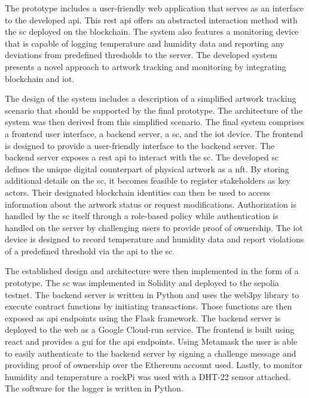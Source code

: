 The prototype includes a user-friendly web application that serves as an interface to the developed \gls{api}. This \gls{rest} \gls{api} offers an abstracted interaction method with the \gls{sc} deployed on the blockchain. The system also features a monitoring device that is capable of logging temperature and humidity data and reporting any deviations from predefined thresholds to the server. The developed system presents a novel approach to artwork tracking and monitoring by integrating blockchain and \gls{iot}.

The design of the system includes a description of a simplified artwork tracking scenario that should be supported by the final prototype. The architecture of the system was then derived from this simplified scenario. The final system comprises a frontend user interface, a backend server, a \gls{sc}, and the \gls{iot} device. The frontend is designed to provide a user-friendly interface to the backend server. The backend server exposes a \gls{rest} \gls{api} to interact with the \gls{sc}. The developed \gls{sc} defines the unique digital counterpart of physical artwork as a \gls{nft}. By storing additional details on the \gls{sc}, it becomes feasible to register stakeholders as key actors. Their designated blockchain identities can then be used to access information about the artwork status or request modifications. Authorization is handled by the \gls{sc} itself through a role-based policy while authentication is handled on the server by challenging users to provide proof of ownership. The \gls{iot} device is designed to record temperature and humidity data and report violations of a predefined threshold via the \gls{api} to the \gls{sc}.

The established design and architecture were then implemented in the form of a prototype. The \gls{sc} was implemented in Solidity and deployed to the sepolia testnet. The backend server is written in Python and uses the web3py library to execute contract functions by initiating transactions. Those functions are then exposed as \gls{api} endpoints using the Flask framework. The backend server is deployed to the web as a Google Cloud-run service. The frontend is built using react and provides a \gls{gui} for the \gls{api} endpoints. Using Metamask the user is able to easily authenticate to the backend server by signing a challenge message and providing proof of ownership over the Ethereum account used. Lastly, to monitor humidity and temperature a rockPi was used with a DHT-22 sensor attached. The software for the logger is written in Python. 

